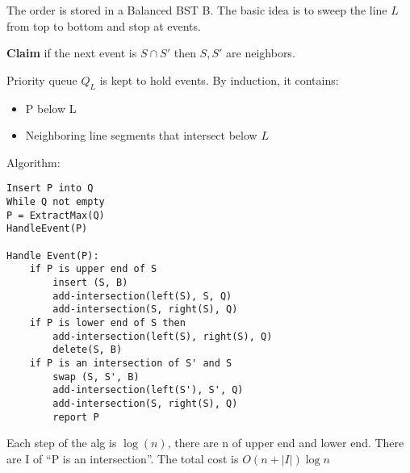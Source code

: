 \documentclass[12pt]{article}
\newcommand{\claim}[1]{\par {\bf Claim }{#1}}
\begin{document}
The order is stored in a Balanced BST B. The basic idea is to sweep the
line $L$ from top to bottom and stop at events.

\claim {if the next event is $S \cap S'$ then $S, S'$ are
neighbors}.

Priority queue $Q_L$ is kept to hold events. By induction, it contains:
\begin{itemize}
\item P below L
\item Neighboring line segments that intersect below $L$
\end{itemize}

Algorithm:
\begin{verbatim}
Insert P into Q
While Q not empty
P = ExtractMax(Q)
HandleEvent(P)

Handle Event(P):
    if P is upper end of S 
        insert (S, B)
        add-intersection(left(S), S, Q)
        add-intersection(S, right(S), Q)
    if P is lower end of S then
        add-intersection(left(S), right(S), Q)
        delete(S, B)
    if P is an intersection of S' and S
        swap (S, S', B)
        add-intersection(left(S'), S', Q)
        add-intersection(S, right(S), Q)
        report P
\end{verbatim}

Each step of the alg is $\log(n)$, there are n of upper end and lower
end. There are I of ``P is an intersection''. The total cost is $O(n +
|I|)\log n$
\end{document}
